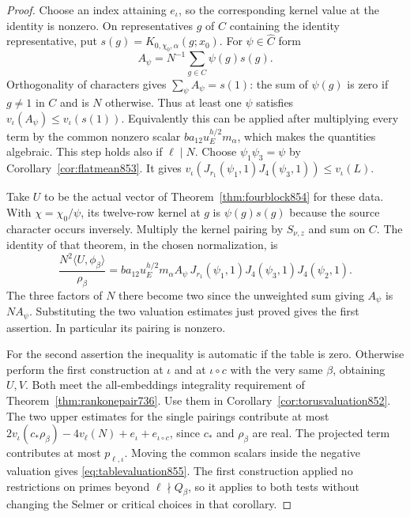 \documentclass[a4paper,11pt]{article}
\theoremstyle{definition}
\theoremstyle{remark}
\numberwithin{equation}{section}
\begin{document}
\begin{proof}
Choose an index attaining \(e_\iota\), so the corresponding
kernel value at the identity is nonzero. On representatives
\(g\) of \(C\) containing the identity representative, put
\(s(g)=K_{0,\chi_0,\alpha}(g;x_0)\). For
\(\psi\in\widehat C\) form
\[
       A_\psi=N^{-1}\sum_{g\in C}\psi(g)s(g).
\]
Orthogonality of characters gives \(\sum_\psi A_\psi=s(1)\):
the sum of \(\psi(g)\) is zero if \(g\ne1\) in \(C\) and is
\(N\) otherwise. Thus at least one \(\psi\) satisfies
\(v_\iota(A_\psi)\le v_\iota(s(1))\). Equivalently this can be
applied after multiplying every term by the common nonzero
scalar \(b a_{12}u_E^{h/2}m_\alpha\), which makes the
quantities algebraic. This step holds also if \(\ell\mid N\).
Choose \(\psi_1\psi_3=\psi\) by Corollary~\ref{cor:flatmean853}.
It gives \(v_\iota(J_{r_1}(\psi_1,1)J_4(\psi_3,1))\le v_\iota(L)\).

Take \(U\) to be the actual vector of
Theorem~\ref{thm:fourblock854} for these data. With
\(\chi=\chi_0/\psi\), its twelve-row kernel at \(g\) is
\(\psi(g)s(g)\) because the source character occurs inversely.
Multiply the kernel pairing by \(S_{\nu,z}\) and sum on \(C\).
The identity of that theorem, in the chosen normalization, is
\[
 \frac{N^2\langle U,\phi_\beta\rangle}{\rho_\beta}
 = b a_{12}u_E^{h/2}m_\alpha A_\psi\,
           J_{r_1}(\psi_1,1)J_4(\psi_3,1)J_4(\psi_2,1).
\]
The three factors of \(N\) there become two since the
unweighted sum giving \(A_\psi\) is \(N A_\psi\). Substituting
the two valuation estimates just proved gives the first
assertion. In particular its pairing is nonzero.

For the second assertion the inequality is automatic if the
table is zero. Otherwise perform the first construction at
\(\iota\) and at \(\iota\circ c\) with the very same
\(\beta\), obtaining \(U,V\). Both meet the all-embeddings
integrality requirement of Theorem~\ref{thm:rankonepair736}.
Use them in Corollary~\ref{cor:torusvaluation852}. The
two upper estimates for the single pairings contribute at
most \(2v_\iota(c_*\rho_\beta)-4v_\ell(N)
+e_\iota+e_{\iota\circ c}\), since \(c_*\) and \(\rho_\beta\)
are real. The projected term contributes at most \(p_{\ell,\iota}\).
Moving the common scalars inside the negative valuation gives
\eqref{eq:tablevaluation855}. The first construction applied
no restrictions on primes beyond \(\ell\nmid Q_\beta\), so it
applies to both tests without changing the Selmer or critical
choices in that corollary.
\end{proof}
\end{document}
